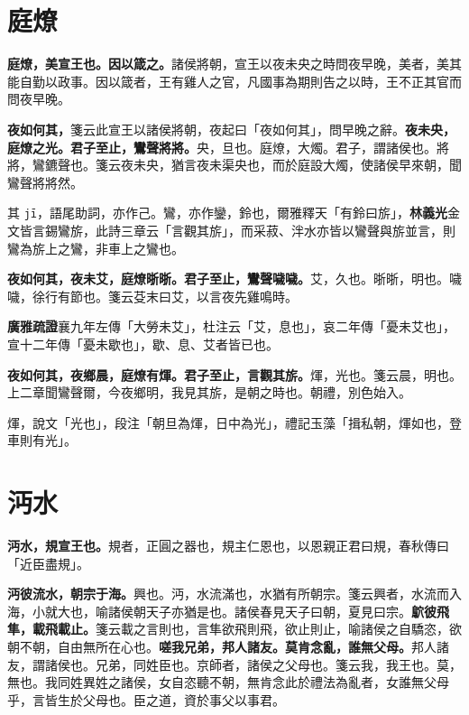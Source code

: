 \section{庭燎}


\textbf{庭燎，美宣王也。因以箴之。}{\footnotesize 諸侯將朝，宣王以夜未央之時問夜早晚，美者，美其能自勤以政事。因以箴者，王有雞人之官，凡國事為期則告之以時，王不正其官而問夜早晚。}

\textbf{夜如何其，}{\footnotesize 箋云此宣王以諸侯將朝，夜起曰「夜如何其」，問早晚之辭。}\textbf{夜未央，庭燎之光。君子至止，鸞聲將將。}{\footnotesize 央，旦也。庭燎，大燭。君子，謂諸侯也。將將，鸞鑣聲也。箋云夜未央，猶言夜未渠央也，而於庭設大燭，使諸侯早來朝，聞鸞聲將將然。}

\begin{quoting}其 \texttt{jī}，語尾助詞，亦作己。鸞，亦作鑾，鈴也，爾雅釋天「有鈴曰旂」，\textbf{林義光}金文皆言錫鸞旂，此詩三章云「言觀其旂」，而采菽、泮水亦皆以鸞聲與旂並言，則鸞為旂上之鸞，非車上之鸞也。\end{quoting}

\textbf{夜如何其，夜未艾，庭燎晣晣。君子至止，鸞聲噦噦。}{\footnotesize 艾，久也。晣晣，明也。噦噦，徐行有節也。箋云芟末曰艾，以言夜先雞鳴時。}

\begin{quoting}\textbf{廣雅疏證}襄九年左傳「大勞未艾」，杜注云「艾，息也」，哀二年傳「憂未艾也」，宣十二年傳「憂未歇也」，歇、息、艾者皆已也。\end{quoting}

\textbf{夜如何其，夜鄉晨，庭燎有煇。君子至止，言觀其旂。}{\footnotesize 煇，光也。箋云晨，明也。上二章聞鸞聲爾，今夜鄉明，我見其旂，是朝之時也。朝禮，別色始入。}

\begin{quoting}煇，說文「光也」，段注「朝旦為煇，日中為光」，禮記玉藻「揖私朝，煇如也，登車則有光」。\end{quoting}

\section{沔水}


\textbf{沔水，規宣王也。}{\footnotesize 規者，正圓之器也，規主仁恩也，以恩親正君曰規，春秋傳曰「近臣盡規」。}

\textbf{沔彼流水，朝宗于海。}{\footnotesize 興也。沔，水流滿也，水猶有所朝宗。箋云興者，水流而入海，小就大也，喻諸侯朝天子亦猶是也。諸侯春見天子曰朝，夏見曰宗。}\textbf{鴥彼飛隼，載飛載止。}{\footnotesize 箋云載之言則也，言隼欲飛則飛，欲止則止，喻諸侯之自驕恣，欲朝不朝，自由無所在心也。}\textbf{嗟我兄弟，邦人諸友。莫肯念亂，誰無父母。}{\footnotesize 邦人諸友，謂諸侯也。兄弟，同姓臣也。京師者，諸侯之父母也。箋云我，我王也。莫，無也。我同姓異姓之諸侯，女自恣聽不朝，無肯念此於禮法為亂者，女誰無父母乎，言皆生於父母也。臣之道，資於事父以事君。}


